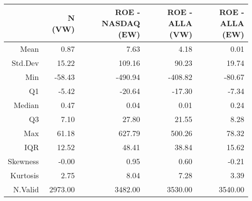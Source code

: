 \begin{table}[ht]
\centering
\begin{tabular}{rrrrr}
  \hline
 & N (VW) & ROE - NASDAQ (EW) & ROE - ALLA (VW) & ROE - ALLA (EW) \\ 
  \hline
Mean & 0.87 & 7.63 & 4.18 & 0.01 \\ 
  Std.Dev & 15.22 & 109.16 & 90.23 & 19.74 \\ 
  Min & -58.43 & -490.94 & -408.82 & -80.67 \\ 
  Q1 & -5.42 & -20.64 & -17.30 & -7.34 \\ 
  Median & 0.47 & 0.04 & 0.01 & 0.24 \\ 
  Q3 & 7.10 & 27.80 & 21.55 & 8.28 \\ 
  Max & 61.18 & 627.79 & 500.26 & 78.32 \\ 
  IQR & 12.52 & 48.41 & 38.84 & 15.62 \\ 
  Skewness & -0.00 & 0.95 & 0.60 & -0.21 \\ 
  Kurtosis & 2.75 & 8.04 & 7.28 & 3.39 \\ 
  N.Valid & 2973.00 & 3482.00 & 3530.00 & 3540.00 \\ 
   \hline
\end{tabular}
\end{table}
